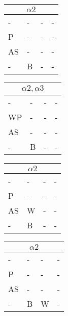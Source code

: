 \documentclass{math}
\begin{document}
\begin{center}
  \begin{tabular}{|p{0.6cm}|p{0.6cm}|p{0.6cm}|p{0.6cm}|}
    \hline
    \multicolumn{4}{|c|}{\( \alpha2 \)} \\ \hline
    - & - & - & - \\ \hline
    P & - & - & - \\ \hline
    AS & - & - & - \\ \hline
    - & B & - & - \\ \hline
  \end{tabular}
  \begin{tabular}{|p{0.6cm}|p{0.6cm}|p{0.6cm}|p{0.6cm}|}
    \hline
    \multicolumn{4}{|c|}{\( \alpha2,\alpha3 \)} \\ \hline
    - & - & - & - \\ \hline
    WP & - & - & - \\ \hline
    AS & - & - & - \\ \hline
    - & B & - & - \\ \hline
  \end{tabular}
  \begin{tabular}{|p{0.6cm}|p{0.6cm}|p{0.6cm}|p{0.6cm}|}
    \hline
    \multicolumn{4}{|c|}{\( \alpha2 \)} \\ \hline
    - & - & - & - \\ \hline
    P & - & - & - \\ \hline
    AS & W & - & - \\ \hline
    - & B & - & - \\ \hline
  \end{tabular}
  \begin{tabular}{|p{0.6cm}|p{0.6cm}|p{0.6cm}|p{0.6cm}|}
    \hline
    \multicolumn{4}{|c|}{\( \alpha2 \)} \\ \hline
    - & - & - & - \\ \hline
    P & - & - & - \\ \hline
    AS & - & - & - \\ \hline
    - & B & W & - \\ \hline
  \end{tabular} \\[0.5cm]


\end{center}
\end{document}
